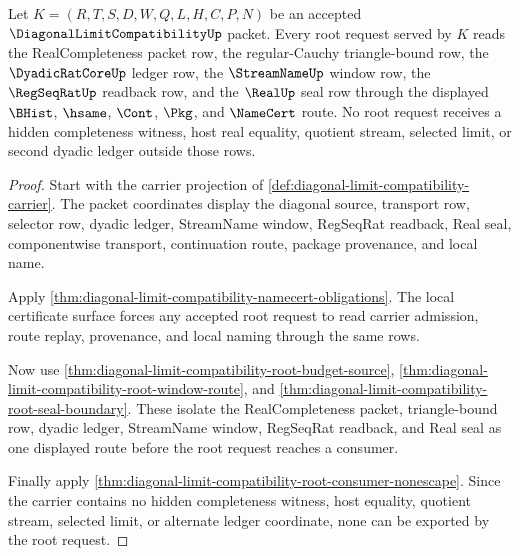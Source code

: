 \begin{theorem}
\label{thm:diagonal-limit-compatibility-root-request-coverage}
Let $K=(R,T,S,D,W,Q,L,H,C,P,N)$ be an accepted $\DiagonalLimitCompatibilityUp$ packet. Every root request served by $K$ reads the RealCompleteness packet row, the regular-Cauchy triangle-bound row, the $\DyadicRatCoreUp$ ledger row, the $\StreamNameUp$ window row, the $\RegSeqRatUp$ readback row, and the $\RealUp$ seal row through the displayed $\BHist$, $\hsame$, $\Cont$, $\Pkg$, and $\NameCert$ route. No root request receives a hidden completeness witness, host real equality, quotient stream, selected limit, or second dyadic ledger outside those rows.
\end{theorem}
\begin{proof}
Start with the carrier projection of \autoref{def:diagonal-limit-compatibility-carrier}. The packet coordinates display the diagonal source, transport row, selector row, dyadic ledger, StreamName window, RegSeqRat readback, Real seal, componentwise transport, continuation route, package provenance, and local name.

Apply \autoref{thm:diagonal-limit-compatibility-namecert-obligations}. The local certificate surface forces any accepted root request to read carrier admission, route replay, provenance, and local naming through the same rows.

Now use \autoref{thm:diagonal-limit-compatibility-root-budget-source}, \autoref{thm:diagonal-limit-compatibility-root-window-route}, and \autoref{thm:diagonal-limit-compatibility-root-seal-boundary}. These isolate the RealCompleteness packet, triangle-bound row, dyadic ledger, StreamName window, RegSeqRat readback, and Real seal as one displayed route before the root request reaches a consumer.

Finally apply \autoref{thm:diagonal-limit-compatibility-root-consumer-nonescape}. Since the carrier contains no hidden completeness witness, host equality, quotient stream, selected limit, or alternate ledger coordinate, none can be exported by the root request.
\end{proof}

